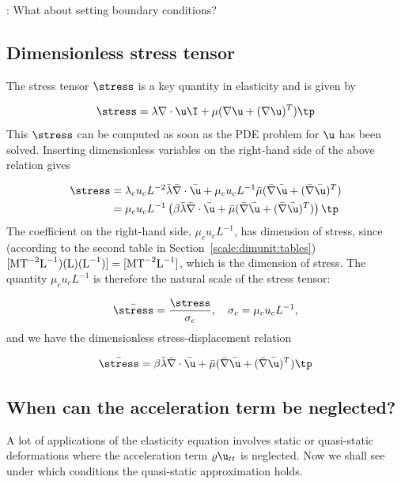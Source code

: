 \documentclass[graybox,envcountchap,sectrefs,final]{svmonodo}
\newcommand{\shortinlinecomment}[3]{{\color{red}{\bf #1}: #2}}
\begin{document}
\shortinlinecomment{hpl 8}{ What about setting boundary conditions? }{ What about setting boundary }

\subsection{Dimensionless stress tensor}
\label{scale:elasticity:PDE1:stress}

The stress tensor $\stress$ is a key quantity in elasticity and is given by

\[ \stress = \lambda\nabla\cdot\u\I + \mu(\nabla\u + (\nabla\u)^T)\tp\]
This $\stress$ can be computed as soon as the PDE problem for $\u$
has been solved.
Inserting dimensionless variables on the right-hand side of the above
relation gives

\begin{align*}
\stress &= \lambda_cu_cL^{-2}\bar\lambda\bar\nabla\cdot\bar\u
+ \mu_cu_cL^{-1}\bar\mu(\bar\nabla\bar\u + (\bar\nabla\bar\u)^T)\\ 
&= \mu_c u_cL^{-1}\left(\beta\bar\lambda\bar\nabla\cdot\bar\u +
\bar\mu(\bar\nabla\bar\u + (\bar\nabla\bar\u)^T)\right)\tp
\end{align*}
The coefficient on the right-hand side, $\mu_c u_cL^{-1}$, has dimension
of stress, since (according to the second table in
Section~\ref{scale:dimunit:tables}) $[\hbox{M}\hbox{T}^{-2}\hbox{L}^{-1})(\hbox{L})(\hbox{L}^{-1})]
=[\hbox{M}\hbox{T}^{-2}\hbox{L}^{-1}]$, which is the dimension of stress.
The quantity $\mu_c u_cL^{-1}$ is therefore the natural scale of the
stress tensor:

\[ \bar\stress = \frac{\stress}{\sigma_c},\quad \sigma_c = \mu_c u_c L^{-1},\]
and we have the dimensionless stress-displacement relation

\begin{equation}
\bar\stress =
\beta\bar\lambda\bar\nabla\cdot\bar\u +
\bar\mu(\bar\nabla\bar\u + (\bar\nabla\bar\u)^T)\tp
\end{equation}

\subsection{When can the acceleration term be neglected?}
\label{scale:elasticity:waves}

A lot of applications of the elasticity equation involves static or
quasi-static deformations where the acceleration term
$\varrho\u_{tt}$ is neglected. Now we shall see under which conditions
the quasi-static approximation holds.
\end{document}
